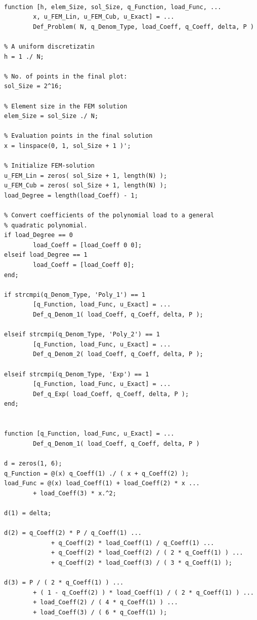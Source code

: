 \begin{lstlisting}[caption = {Define the Problem and Its Analytical Solution}, label = lst:Def_Problem]

function [h, elem_Size, sol_Size, q_Function, load_Func, ...
		x, u_FEM_Lin, u_FEM_Cub, u_Exact] = ...
		Def_Problem( N, q_Denom_Type, load_Coeff, q_Coeff, delta, P )

% A uniform discretizatin
h = 1 ./ N;

% No. of points in the final plot:
sol_Size = 2^16;

% Element size in the FEM solution
elem_Size = sol_Size ./ N;

% Evaluation points in the final solution
x = linspace(0, 1, sol_Size + 1 )';

% Initialize FEM-solution
u_FEM_Lin = zeros( sol_Size + 1, length(N) );
u_FEM_Cub = zeros( sol_Size + 1, length(N) );
load_Degree = length(load_Coeff) - 1;

% Convert coefficients of the polynomial load to a general
% quadratic polynomial.
if load_Degree == 0
		load_Coeff = [load_Coeff 0 0];
elseif load_Degree == 1
		load_Coeff = [load_Coeff 0];
end;

if strcmpi(q_Denom_Type, 'Poly_1') == 1
		[q_Function, load_Func, u_Exact] = ...
		Def_q_Denom_1( load_Coeff, q_Coeff, delta, P );

elseif strcmpi(q_Denom_Type, 'Poly_2') == 1
		[q_Function, load_Func, u_Exact] = ...
		Def_q_Denom_2( load_Coeff, q_Coeff, delta, P );

elseif strcmpi(q_Denom_Type, 'Exp') == 1
		[q_Function, load_Func, u_Exact] = ...
		Def_q_Exp( load_Coeff, q_Coeff, delta, P );
end;


function [q_Function, load_Func, u_Exact] = ...
		Def_q_Denom_1( load_Coeff, q_Coeff, delta, P )

d = zeros(1, 6);
q_Function = @(x) q_Coeff(1) ./ ( x + q_Coeff(2) );
load_Func = @(x) load_Coeff(1) + load_Coeff(2) * x ...
		+ load_Coeff(3) * x.^2;

d(1) = delta;

d(2) = q_Coeff(2) * P / q_Coeff(1) ...
			 + q_Coeff(2) * load_Coeff(1) / q_Coeff(1) ...
			 + q_Coeff(2) * load_Coeff(2) / ( 2 * q_Coeff(1) ) ...
			 + q_Coeff(2) * load_Coeff(3) / ( 3 * q_Coeff(1) );

d(3) = P / ( 2 * q_Coeff(1) ) ...
		+ ( 1 - q_Coeff(2) ) * load_Coeff(1) / ( 2 * q_Coeff(1) ) ...
		+ load_Coeff(2) / ( 4 * q_Coeff(1) ) ...
		+ load_Coeff(3) / ( 6 * q_Coeff(1) );        


\end{lstlisting}
